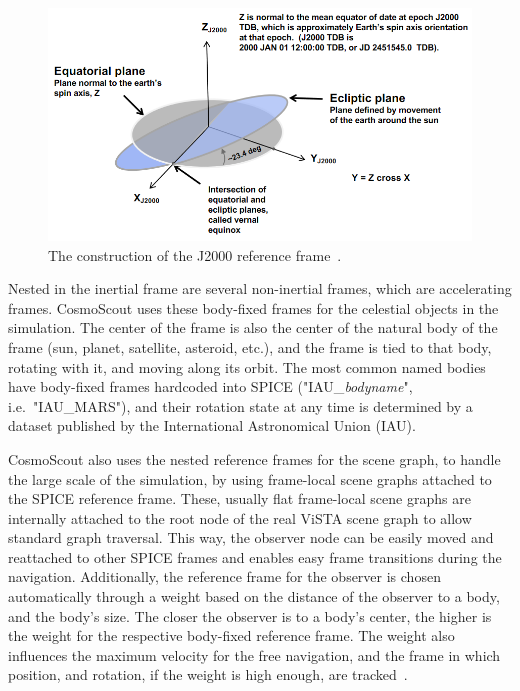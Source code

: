 \begin{figure}[h]
    \centering
    \includegraphics[width=\textwidth]{content/3_current_state/img/J2000[NAIFoverview]}
    \caption{The construction of the J2000 reference frame~\cite{NAIFoverview}.}
    \label{fig:J2000}
\end{figure}

Nested in the inertial frame are several non-inertial frames, which are accelerating frames.
CosmoScout uses these body-fixed frames for the celestial objects in the simulation.
The center of the frame is also the center of the natural body of the frame (sun, planet, satellite, asteroid, etc.),
and the frame is tied to that body, rotating with it, and moving along its orbit.
The most common named bodies have body-fixed frames hardcoded into SPICE ("IAU\_\textit{bodyname}", i.e.\ "IAU\_MARS"),
and their rotation state at any time is determined by a dataset published by the International Astronomical Union (IAU).

CosmoScout also uses the nested reference frames for the scene graph, to handle the large scale of the simulation, by
using frame-local scene graphs attached to the SPICE reference frame.
These, usually flat frame-local scene graphs are internally attached to the root node of the real ViSTA scene graph to
allow standard graph traversal.
This way, the observer node can be easily moved and reattached to other SPICE frames and enables easy frame
transitions during the navigation.
Additionally, the reference frame for the observer is chosen automatically through a weight based on the distance of
the observer to a body, and the body's size.
The closer the observer is to a body's center, the higher is the weight for the respective body-fixed reference frame.
The weight also influences the maximum velocity for the free navigation, and the frame in which position, and
rotation, if the weight is high enough, are tracked~\cite{SimonPaper}.

